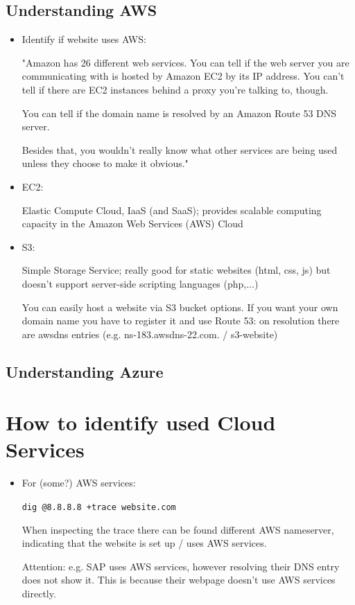 \documentclass[12pt]{article}
\begin{document}
\newpage
\subsection*{Understanding AWS}
\begin{itemize}
    \item Identify if website uses AWS:
    
    "Amazon has 26 different web services. You can tell if the web server you are communicating with is hosted by Amazon EC2 by its IP address. You can't tell if there are EC2 instances behind a proxy you're talking to, though.

    You can tell if the domain name is resolved by an Amazon Route 53 DNS server.

    Besides that, you wouldn't really know what other services are being used unless they choose to make it obvious."
    
    \item EC2:
    
    Elastic Compute Cloud, IaaS (and SaaS); provides scalable computing capacity in the Amazon Web Services (AWS) Cloud
    
    \item S3:
    
    Simple Storage Service; really good for static websites (html, css, js) but doesn't support server-side scripting languages (php,...)
    
    You can easily host a website via S3 bucket options. If you want your own domain name you have to register it and use Route 53: on resolution there are awsdns entries (e.g. ns-183.awsdns-22.com. / s3-website)
    
\end{itemize}

\subsection*{Understanding Azure}




\newpage
\section*{How to identify used Cloud Services}
\begin{itemize}
    \item For (some?) AWS services:
    
    \verb|dig @8.8.8.8 +trace website.com|
    
    When inspecting the trace there can be found different AWS nameserver, indicating that the website is set up / uses AWS services.
    
    Attention: e.g. SAP uses AWS services, however resolving their DNS entry does not show it. This is because their webpage doesn't use AWS services directly.
\end{itemize}
\end{document}
